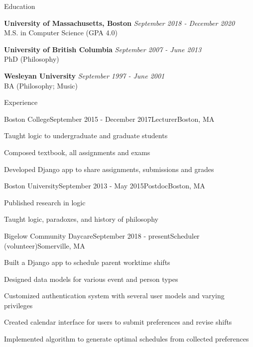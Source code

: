 \documentclass{resume} %
\begin{document}

\begin{rSection}{Education}

{\bf University of Massachusetts, Boston} \hfill {\em September 2018 - December 2020} \\ 
M.S. in Computer Science (GPA 4.0)


{\bf University of British Columbia} \hfill {\em September 2007 - June 2013} \\ 
PhD (Philosophy)

{\bf Wesleyan University} \hfill {\em September 1997 - June 2001} \\ 
BA (Philosophy; Music)


\end{rSection}


\begin{rSection}{Experience}

\begin{rSubsection}{Boston College}{September 2015 - December 2017}{Lecturer}{Boston, MA}
\item Taught logic to undergraduate and graduate students
\item Composed textbook, all assignments and exams
\item Developed Django app to share assignments, submissions and grades
\end{rSubsection}

\begin{rSubsection}{Boston University}{September 2013 - May 2015}{Postdoc}{Boston, MA}
\item Published research in logic
\item Taught logic, paradoxes, and history of philosophy
\end{rSubsection}

\begin{rSubsection}{Bigelow Community Daycare}{September 2018 - present}{Scheduler (volunteer)}{Somerville, MA}
\item Built a Django app to schedule parent worktime shifts
\item Designed data models for various event and person types
\item Customized authentication system with several user models and varying privileges
\item Created calendar interface for users to submit preferences and revise shifts
\item Implemented algorithm to generate optimal schedules from collected preferences
\end{rSubsection}


\end{rSection}
\end{document}
